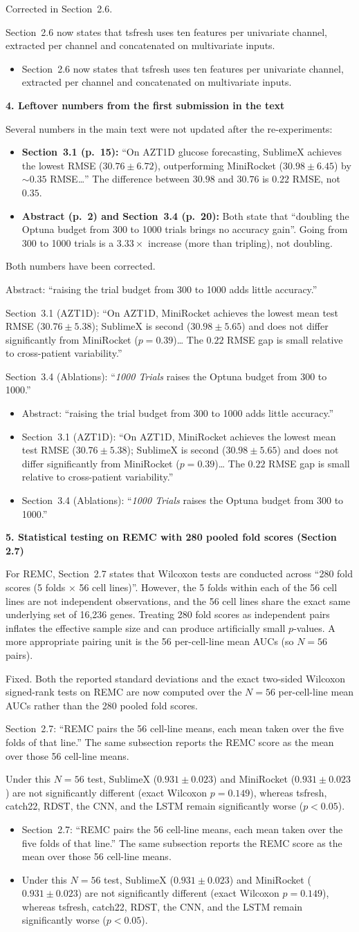 \documentclass[11pt]{article}
\makeatletter
\newcommand{\rsp}{\par\vspace{0.9em}}
\newcommand{\rcitem}[2]{\begin{reviewerbox}\textbf{#1}\par\smallskip#2\end{reviewerbox}}
\newcommand{\response}[2]{%
  \begin{responsebox}#1%
  \def\@responseitems{#2}%
  \ifx\@responseitems\empty\else\begin{itemize}[nosep,leftmargin=1.2em]#2\end{itemize}\fi
  \end{responsebox}\rsp}
\makeatother
\begin{document}
\response{Corrected in Section~2.6.}{
  \item Section~2.6 now states that tsfresh uses ten features per univariate channel, extracted per channel and concatenated on multivariate inputs.
}

\rcitem{4. Leftover numbers from the first submission in the text}{Several numbers in the main text were not updated after the re-experiments:
\begin{itemize}[nosep,leftmargin=1.4em]
  \item \textbf{Section~3.1 (p.~15):} ``On AZT1D glucose forecasting, SublimeX achieves the lowest RMSE ($30.76 \pm 6.72$), outperforming MiniRocket ($30.98 \pm 6.45$) by $\sim 0.35$ RMSE\ldots'' The difference between $30.98$ and $30.76$ is $0.22$ RMSE, not $0.35$.
  \item \textbf{Abstract (p.~2) and Section~3.4 (p.~20):} Both state that ``doubling the Optuna budget from 300 to 1000 trials brings no accuracy gain''. Going from 300 to 1000 trials is a $3.33\times$ increase (more than tripling), not doubling.
\end{itemize}}

\response{Both numbers have been corrected.}{
  \item Abstract: ``raising the trial budget from 300 to 1000 adds little accuracy.''
  \item Section~3.1 (AZT1D): ``On AZT1D, MiniRocket achieves the lowest mean test RMSE ($30.76{\pm}5.38$); SublimeX is second ($30.98{\pm}5.65$) and does not differ significantly from MiniRocket ($p{=}0.39$)\ldots{} The $0.22$ RMSE gap is small relative to cross-patient variability.''
  \item Section~3.4 (Ablations): ``\emph{1000 Trials} raises the Optuna budget from 300 to 1000.''
}

\rcitem{5. Statistical testing on REMC with 280 pooled fold scores (Section 2.7)}{For REMC, Section~2.7 states that Wilcoxon tests are conducted across ``280 fold scores (5 folds $\times$ 56 cell lines)''. However, the 5 folds within each of the 56 cell lines are not independent observations, and the 56 cell lines share the exact same underlying set of 16,236 genes. Treating 280 fold scores as independent pairs inflates the effective sample size and can produce artificially small $p$-values. A more appropriate pairing unit is the 56 per-cell-line mean AUCs (so $N=56$ pairs).}

\response{Fixed. Both the reported standard deviations and the exact two-sided Wilcoxon signed-rank tests on REMC are now computed over the $N=56$ per-cell-line mean AUCs rather than the 280 pooled fold scores.}{
  \item Section~2.7: ``REMC pairs the 56 cell-line means, each mean taken over the five folds of that line.'' The same subsection reports the REMC score as the mean over those 56 cell-line means.
  \item Under this $N=56$ test, SublimeX ($0.931 \pm 0.023$) and MiniRocket ($0.931 \pm 0.023$) are not significantly different (exact Wilcoxon $p = 0.149$), whereas tsfresh, catch22, RDST, the CNN, and the LSTM remain significantly worse ($p < 0.05$).
}
\end{document}
